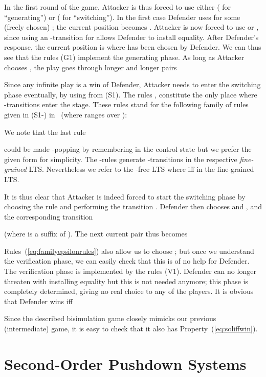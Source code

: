 \documentclass[11pt]{article}
\begin{document}
In the first round of the game, Attacker is thus forced
to use either  ( for ``generating'')
or  ( for ``switching'').
In the first case Defender uses
 for some (freely chosen) 
;
the current position becomes .
Attacker is now forced to use 
or , since using an 
-transition for  allows Defender to install equality.
After Defender's response,
the current position is 
 where  has been
chosen by Defender. 
We can thus see that the rules (G1) implement the generating phase. 
As long as Attacker chooses , the play goes
through longer and longer pairs

Since any infinite play is a win of Defender,
Attacker needs to enter the switching phase eventually, by using 
 from (S1).
The rules , 
 constitute the only place where
-transitions enter the stage.
These rules stand for the 
following family of rules
given in (S1-) in~\cite{DBLP:journals/jacm/JancarS08} 
(where  ranges over ):

We note that the last rule 

could be made 
-popping by remembering  
in the control state but we prefer the given form for simplicity.
The -rules generate 
-transitions
in the respective \emph{fine-grained} LTS. 
Nevertheless 
we refer to the -free LTS where 
 iff 
in the fine-grained LTS.

It is thus clear that Attacker is indeed forced to start 
the switching phase by choosing the rule 
and performing the transition 
.
Defender then chooses  and ,
and the corresponding transition

(where  is a suffix of 
). 
The next current pair thus becomes

Rules~(\ref{eq:familyepsilonrules}) also allow us to choose
;
but once we understand the verification phase, 
we can easily check that this is of no help for Defender.
The verification phase is implemented by the rules (V1).
Defender can no longer threaten with installing equality but this is
not needed anymore; this phase is completely determined,
giving no real choice to any of the players.  
It is obvious that Defender  wins iff

Since the described
bisimulation game closely mimicks our previous (intermediate) game,
it is easy to check that it also has Property~(\ref{eq:soliffwin}).








\section{Second-Order Pushdown Systems}\label{sec:undecsecondorder}
\end{document}
